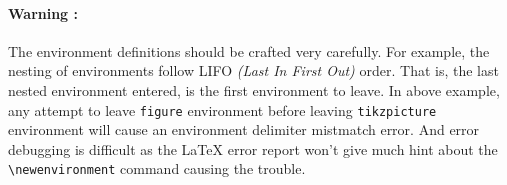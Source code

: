 \documentclass{article}
\theoremstyle{definition}
\theoremstyle{remark}
\begin{document}
\paragraph{Warning :}
	The environment definitions should be crafted very carefully. For example, the nesting of environments follow LIFO \textit{(Last In First Out)} order. That is, the last nested environment entered, is the first environment to leave. In above example, any attempt to leave \texttt{figure} environment before leaving \texttt{tikzpicture} environment will cause an environment delimiter mistmatch error. And error debugging is difficult as the \LaTeX{} error report won't give much hint about the \texttt{\textbackslash newenvironment} command causing the trouble. 
\end{document}
